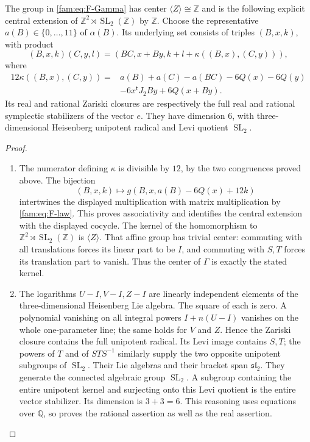 \begin{proposition}\hypertarget{tag-01RA}{}\label{fam:src:F.1.2}\label{fam:st:F.1.2}

The group in \eqref{fam:eq:F-Gamma} has center
$\langle Z\rangle\cong\mathbb Z$ and is the following explicit central
extension of $\mathbb Z^2\rtimes\operatorname{SL}_2(\mathbb Z)$ by
$\mathbb Z$.  Choose the representative $a(B)\in\{0,\ldots,11\}$ of
$\alpha(B)$.  Its underlying set consists of triples $(B,x,k)$, with
product
\[
 (B,x,k)(C,y,l)=(BC,x+By,k+l+\kappa((B,x),(C,y))),
\]
where
\begin{align*}
12\kappa((B,x),(C,y))={}&a(B)+a(C)-a(BC)-6Q(x)-6Q(y)\\
 &-6x^{\mathsf t}J_2By+6Q(x+By).
\end{align*}
Its real and rational Zariski closures are respectively the full real
and rational symplectic stabilizers of the vector $e$.  They have
dimension $6$, with three-dimensional Heisenberg unipotent radical and
Levi quotient $\operatorname{SL}_2$.
\end{proposition}



\begin{proof}
\begin{enumerate}[label=\arabic*.,leftmargin=*]
\item The numerator defining $\kappa$ is divisible by $12$, by the two
congruences proved above.  The bijection
\[
 (B,x,k)\longmapsto g(B,x,a(B)-6Q(x)+12k)
\]
intertwines the displayed multiplication with matrix multiplication by
\eqref{fam:eq:F-law}.  This proves associativity and identifies the central extension with the
displayed cocycle.  The kernel
of the homomorphism to $\mathbb Z^2\rtimes\operatorname{SL}_2(\mathbb Z)$
is $\langle Z\rangle$.  That affine group has trivial center: commuting
with all translations forces its linear part to be $I$, and commuting
with $S,T$ forces its translation part to vanish.  Thus the center of
$\Gamma$ is exactly the stated kernel.

\item The logarithms $U-I,V-I,Z-I$ are linearly independent elements of the
three-dimensional Heisenberg Lie algebra.  The square of each is zero.
A polynomial vanishing on all integral powers $I+n(U-I)$ vanishes on
the whole one-parameter line; the same holds for $V$ and $Z$.  Hence the
Zariski closure contains the full unipotent radical.  Its Levi image
contains $S,T$; the powers of $T$ and of $STS^{-1}$ similarly supply the
two opposite unipotent subgroups of $\operatorname{SL}_2$.  Their Lie
algebras and their bracket span $\mathfrak{sl}_2$.  They generate the
connected algebraic group $\operatorname{SL}_2$.  A subgroup containing
the entire unipotent kernel and surjecting onto this Levi quotient is
the entire vector stabilizer.  Its dimension is $3+3=6$.  This reasoning
uses equations over $\mathbb Q$, so proves the rational assertion as
well as the real assertion.
\end{enumerate}
\end{proof}

